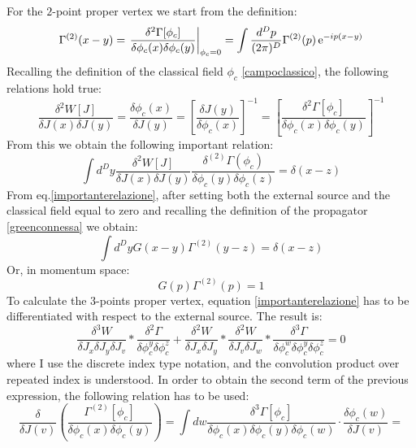 For the $2$-point proper vertex we start from the definition:
\begin{equation}
 \Gamma^{(2)}(x - y) = \left.\frac{\delta^2\Gamma[\phi_c]}{\delta\phi_c(x)\delta\phi_c(y)}\right|_{\phi_c=0} = \int\frac{d^Dp}{(2\pi)^D}\Gamma^{(2)}(p) \operatorname{e}^{-ip(x-y)}
\end{equation}
Recalling the definition of the classical field $\phi_c$ \eqref{campoclassico}, the following relations hold true:
\begin{equation}
 \frac{\delta^2W[J]}{\delta J(x) \delta J(y)} =  \frac{\delta \phi_c(x)}{\delta J(y)} = \left[\frac{\delta J(y)}{\delta \phi_c(x)}\right]^{-1} = \left[\frac{\delta^2\Gamma[\phi_c]}{\delta\phi_c(x)\delta\phi_c(y)}\right]^{-1}
\end{equation}
From this we obtain the following important relation:
\begin{equation}\label{importanterelazione}
 \int d^Dy \frac{\delta^2W[J]}{\delta J(x) \delta J(y)}\frac{\delta^{(2)}\Gamma(\phi_c)}{\delta\phi_c(y)\delta\phi_c(z)} = \delta(x - z)
\end{equation}
From eq.\eqref{importanterelazione}, after setting both the external source and the classical field equal to zero
and recalling the definition of the propagator \eqref{greenconnessa} we obtain:
\begin{equation}
\int d^Dy G(x - y) \Gamma^{(2)} ( y - z) = \delta(x - z)
\end{equation}
Or, in momentum space:
\begin{equation}
  G(p)\Gamma^{(2)}(p) = 1
\end{equation}
To calculate the $3$-points proper vertex, equation \eqref{importanterelazione} has to be differentiated with respect to the external source.
The result is:
\begin{equation}\label{soldati3punti}
 \frac{\delta^3W}{\delta J_x \delta J_y \delta J_v}*\frac{\delta^2\Gamma}{\delta\phi^y_c\delta\phi^z_c} + \frac{\delta^2W}{\delta J_x \delta J_y}*\frac{\delta^2W}{\delta J_v \delta J_w}*\frac{\delta^3\Gamma}{\delta\phi^w_c\delta\phi^y_c\delta\phi^z_c} = 0
\end{equation}
where I use the discrete index type notation, and the convolution product over repeated index is understood.
In order to obtain the second term of the previous expression, the following relation has to be used:
\begin{equation}
\frac{\delta}{\delta J(v)}\left(\frac{\Gamma^{(2)}[\phi_c]}{\delta\phi_c(x)\delta\phi_c(y)}\right) = \int dw \frac{\delta^3\Gamma[\phi_c]}{\delta\phi_c(x)\delta\phi_c(y)\delta\phi_c(w)}\cdot\frac{\delta\phi_c(w)}{\delta J(v)}= 
\end{equation}

